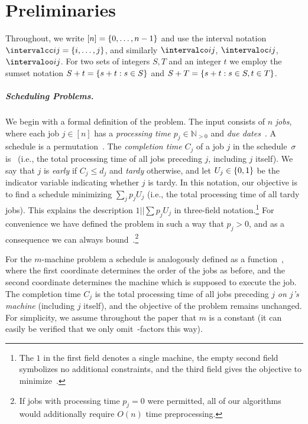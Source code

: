 \documentclass[10pt,a4paper]{article}
\newcommand\Nat{\mathbb N}
\DeclarePairedDelimiter\set{\lbrace}{\rbrace}
\newcommand\Order{O}
\newcommand\MTPT{\smash{$1||\sum p_j U_j$}}
\newcommand\mMTPT{\smash{$P_m||\sum p_j U_j$}}
\begin{document}


\section{Preliminaries}
\label{sec:preliminaries}
Throughout, we write $[n] = \set{0, \dots, n-1}$ and use the interval notation $\intervalcc ij = \set{i, \dots, j}$, and similarly $\intervalco ij$, $\intervaloc ij$, $\intervaloo ij$. For two sets of integers $S, T$ and an integer $t$ we employ the sumset notation $S + t = \set{s + t : s \in S}$ and $S + T = \set{s + t : s \in S, t \in T}$.

\subparagraph{Scheduling Problems.}
We begin with a formal definition of the \MTPT{} problem. The input consists of $n$ \emph{jobs}, where each job $j \in [n]$ has a \emph{processing time $p_j \in \Nat_{> 0}$} and \emph{due dates~\makebox{$d_j \in \Nat_{> 0}$}}. A schedule is a permutation~\makebox{$\sigma : [n] \to [n]$}. The \emph{completion time $C_j$} of a job $j$ in the schedule~$\sigma$ is~ (i.e., the total processing time of all jobs preceding $j$, including $j$ itself). We say that $j$ is \emph{early} if $C_j \leq d_j$ and \emph{tardy} otherwise, and let $U_j \in \set{0, 1}$ be the indicator variable indicating whether $j$ is tardy. In this notation, our objective is to find a schedule minimizing $\sum_j p_j U_j$ (i.e., the total processing time of all tardy jobs). This explains the description $1||\sum p_j U_j$ in three-field notation.\footnote{The $1$ in the first field denotes a single machine, the empty second field symbolizes no additional constraints, and the third field gives the objective to minimize~.} For convenience we have defined the problem in such a way that $p_j > 0$, and as a consequence we can always bound~.\footnote{If jobs with processing time $p_j = 0$ were permitted, all of our algorithms would additionally require $\Order(n)$ time preprocessing.}

For the $m$-machine problem \mMTPT{} a schedule is analogously defined as a function~\makebox{$\sigma : [n] \to [n] \times [m]$}, where the first coordinate determines the order of the jobs as before, and the second coordinate determines the machine which is supposed to execute the job. The completion time $C_j$ is the total processing time of all jobs preceding $j$ \emph{on $j$'s machine} (including $j$ itself), and the objective of the problem remains unchanged. For simplicity, we assume throughout the paper that $m$ is a constant (it can easily be verified that we only omit~\smash{$m^{\Order(1)}$}-factors this way).
\end{document}
